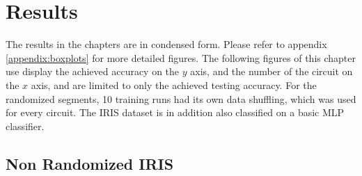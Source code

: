 
\chapter{Results} %

\label{chapter:results}

The results in the chapters are in condensed form. Please refer to appendix \ref{appendix:boxplots} for more detailed figures. The following figures of this chapter use display the achieved accuracy on the $y$ axis, and the number of the circuit on the $x$ axis, and are limited to only the achieved testing accuracy. For the randomized segments, 10 training runs had its own data shuffling, which was used for every circuit. The IRIS dataset is in addition also classified on a basic MLP classifier.
\def \newboxplotwidth {215pt}


\clearpage
\section{Non Randomized IRIS}
\label{chapter:iris_non_randomized}


